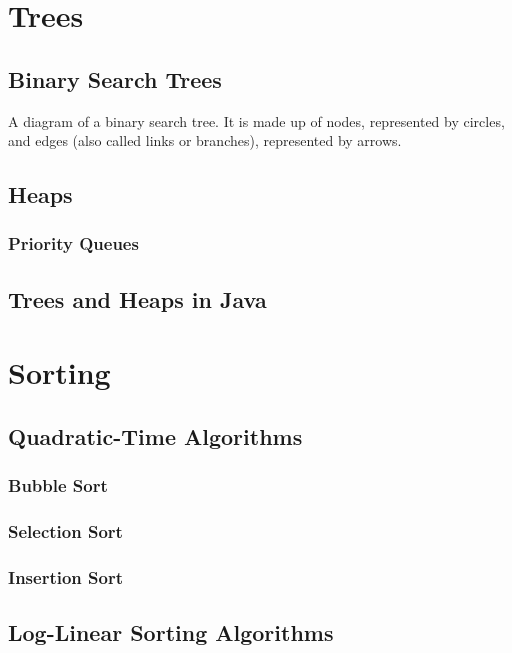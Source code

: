 \documentclass[10pt,a4paper]{book}
\begin{document}
\chapter{Trees}


\section{Binary Search Trees}

A diagram of a binary search tree.  It is made up of nodes, represented by circles, and edges (also called links or branches), represented by arrows.  


\section{Heaps}


\subsection{Priority Queues}

\section{Trees and Heaps in Java}
\chapter{Sorting}


\section{Quadratic-Time Algorithms}

\subsection{Bubble Sort}

\subsection{Selection Sort}

\subsection{Insertion Sort}


\section{Log-Linear Sorting Algorithms}
\end{document}

